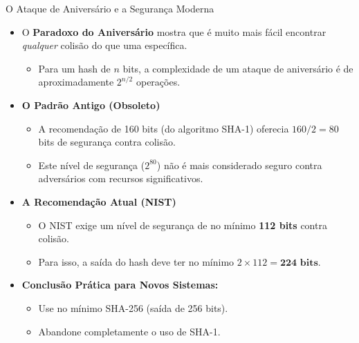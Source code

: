 \documentclass{beamer}
\begin{document}
\begin{frame}{O Ataque de Aniversário e a Segurança Moderna}

    \begin{itemize}
        \item O \textbf{Paradoxo do Aniversário} mostra que é muito mais fácil encontrar \textit{qualquer} colisão do que uma específica.
        \begin{itemize}
            \item Para um hash de $n$ bits, a complexidade de um ataque de aniversário é de aproximadamente $2^{n/2}$ operações.
        \end{itemize}
        
        \bigskip
        \item \textbf{O Padrão Antigo (Obsoleto)}
        \begin{itemize}
            \item A recomendação de 160 bits (do algoritmo SHA-1) oferecia $160/2 = 80$ bits de segurança contra colisão.
            \item Este nível de segurança ($2^{80}$) \alert{não é mais considerado seguro} contra adversários com recursos significativos.
        \end{itemize}

        \bigskip
        \item \textbf{A Recomendação Atual (NIST)}
        \begin{itemize}
            \item O NIST exige um nível de segurança de no mínimo \textbf{112 bits} contra colisão.
            \item Para isso, a saída do hash deve ter no mínimo $2 \times 112 = \textbf{224 bits}$.
        \end{itemize}

        \bigskip
        \item \textbf{Conclusão Prática para Novos Sistemas:}
        \begin{itemize}
            \item<2-> \alert{Use no mínimo SHA-256} (saída de 256 bits).
            \item<2-> Abandone completamente o uso de SHA-1.
        \end{itemize}
    \end{itemize}
\end{frame}
\end{document}

